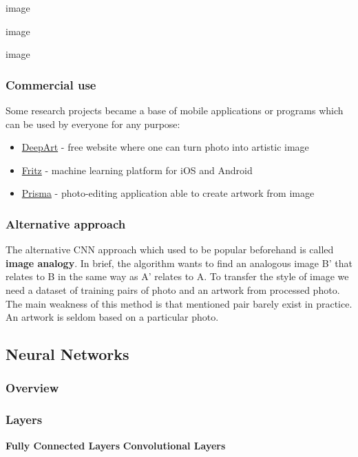 \documentclass[../Main.tex]{subfiles}
\begin{document}
    image
    
    image
    
    image
    
    \subsubsection{Commercial use}
    Some research projects became a base of mobile applications or programs which can be used by everyone for any purpose:
    \begin{itemize}
        \item \href{https://deepart.io}{DeepArt} - free website where one can turn photo into artistic image
        \item \href{https://www.fritz.ai}{Fritz} - machine learning platform for iOS and Android 
        \item \href{https://prisma-ai.com}{Prisma} - photo-editing application able to create artwork from image
    \end{itemize}
    
    \subsubsection{Alternative approach}
    The alternative CNN approach which used to be popular beforehand is called \textbf{image analogy}. In brief, the algorithm wants to find an analogous image B' that relates to B in the same way as A' relates to A.  To transfer the style of image we need a dataset of training pairs of photo and an artwork from processed photo. The main weakness of this method is that mentioned pair barely exist in practice. An artwork is seldom based on a particular photo.
    
\subsection{Neural Networks}


    \subsubsection{Overview}
    \subsubsection{Layers}
        \textbf{Fully Connected Layers}
        \textbf{Convolutional Layers}
\end{document}
